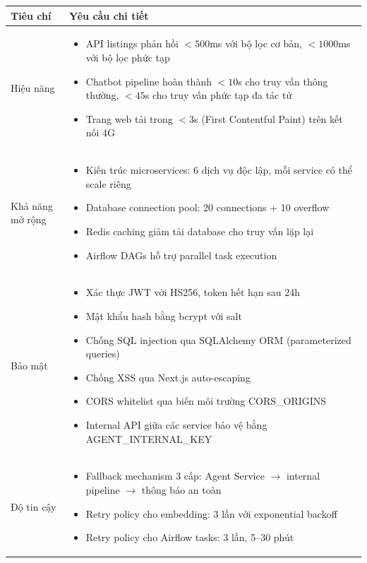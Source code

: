 \begin{longtable}{|p{4cm}|p{9.5cm}|}
    \hline
    \textbf{Tiêu chí} & \textbf{Yêu cầu chi tiết} \\
    \hline
    Hiệu năng & 
    \begin{itemize}
        \item API listings phản hồi $<500$ms với bộ lọc cơ bản, $<1000$ms với bộ lọc phức tạp
        \item Chatbot pipeline hoàn thành $<10$s cho truy vấn thông thường, $<45$s cho truy vấn phức tạp đa tác tử
        \item Trang web tải trong $<3$s (First Contentful Paint) trên kết nối 4G
    \end{itemize} \\
    \hline
    Khả năng mở rộng &
    \begin{itemize}
        \item Kiến trúc microservices: 6 dịch vụ độc lập, mỗi service có thể scale riêng
        \item Database connection pool: 20 connections + 10 overflow
        \item Redis caching giảm tải database cho truy vấn lặp lại
        \item Airflow DAGs hỗ trợ parallel task execution
    \end{itemize} \\
    \hline
    Bảo mật &
    \begin{itemize}
        \item Xác thực JWT với HS256, token hết hạn sau 24h
        \item Mật khẩu hash bằng bcrypt với salt
        \item Chống SQL injection qua SQLAlchemy ORM (parameterized queries)
        \item Chống XSS qua Next.js auto-escaping
        \item CORS whitelist qua biến môi trường CORS\_ORIGINS
        \item Internal API giữa các service bảo vệ bằng AGENT\_INTERNAL\_KEY
    \end{itemize} \\
    \hline
    Độ tin cậy &
    \begin{itemize}
        \item Fallback mechanism 3 cấp: Agent Service $\rightarrow$ internal pipeline $\rightarrow$ thông báo an toàn
        \item Retry policy cho embedding: 3 lần với exponential backoff
        \item Retry policy cho Airflow tasks: 3 lần, 5--30 phút

\end{itemize}
\end{longtable}
